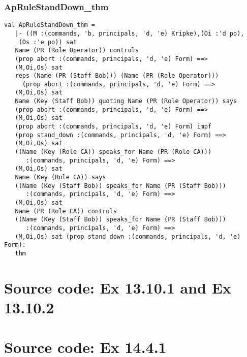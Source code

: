 \documentclass{report}
\begin{document}
\subsection{ApRuleStandDown_thm}
\label{op-14-5}
\begin{session}
  \begin{scriptsize}
\begin{verbatim}
val ApRuleStandDown_thm =
   |- ((M :(commands, 'b, principals, 'd, 'e) Kripke),(Oi :'d po),
    (Os :'e po)) sat
   Name (PR (Role Operator)) controls
   (prop abort :(commands, principals, 'd, 'e) Form) ==>
   (M,Oi,Os) sat
   reps (Name (PR (Staff Bob))) (Name (PR (Role Operator)))
     (prop abort :(commands, principals, 'd, 'e) Form) ==>
   (M,Oi,Os) sat
   Name (Key (Staff Bob)) quoting Name (PR (Role Operator)) says
   (prop abort :(commands, principals, 'd, 'e) Form) ==>
   (M,Oi,Os) sat
   (prop abort :(commands, principals, 'd, 'e) Form) impf
   (prop stand_down :(commands, principals, 'd, 'e) Form) ==>
   (M,Oi,Os) sat
   ((Name (Key (Role CA)) speaks_for Name (PR (Role CA)))
      :(commands, principals, 'd, 'e) Form) ==>
   (M,Oi,Os) sat
   Name (Key (Role CA)) says
   ((Name (Key (Staff Bob)) speaks_for Name (PR (Staff Bob)))
      :(commands, principals, 'd, 'e) Form) ==>
   (M,Oi,Os) sat
   Name (PR (Role CA)) controls
   ((Name (Key (Staff Bob)) speaks_for Name (PR (Staff Bob)))
      :(commands, principals, 'd, 'e) Form) ==>
   (M,Oi,Os) sat (prop stand_down :(commands, principals, 'd, 'e) Form):
   thm
\end{verbatim}
  \end{scriptsize}
\end{session}



\appendix{}

\chapter{Source code: Ex 13.10.1 and Ex 13.10.2}
\label{cha:source-code-13}



\chapter{Source code: Ex 14.4.1}
\label{cha:source-code-14}

\end{document}
